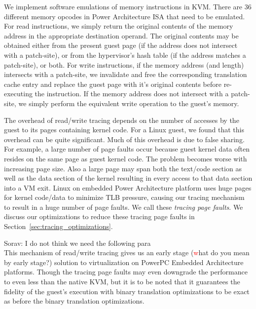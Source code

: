 We implement software emulations of memory instructions in KVM. There are 36 different memory opcodes in Power Architecture ISA that need to be emulated. For read instructions, we simply return the original contents of the memory address in the appropriate destination operand. The original contents may be obtained either from the present guest page (if the address does not intersect with a patch-site), or from the hypervisor's hash table (if the address matches a patch-site), or both. For write instructions, if the memory address (and length) intersects with a patch-site, we invalidate and free the corresponding translation cache entry and replace the guest page with it's original contents before re-executing the instruction. If the memory address does not intersect with a patch-site, we simply perform the equivalent write operation to the guest's memory. 

The overhead of read/write tracing depends on the number of accesses by the guest to its pages containing kernel code. For a Linux guest, we found that this overhead can be quite significant. Much of this overhead is due to false sharing. For example, a large number of page faults occur because guest kernel data often resides on the same page as guest kernel code. The problem becomes worse with increasing page size. Also a large page may span both the text/code section as well as the data section of the kernel resulting in every access to that data section into a VM exit. Linux on embedded Power Architecture platform uses huge pages for kernel code/data to minimize TLB pressure, causing our tracing mechanism to result in a huge number of page faults. We call these {\em tracing page faults}. We discuss our optimizations to reduce these tracing page faults in Section~\ref{sec:tracing_optimizations}.

Sorav: I do not think we need the following para\\
This mechanism of read/write tracing gives us an early stage ({\textcolor{red}what do you mean by early stage?}) solution to virtualization on PowerPC Embedded Architecture platforms. Though the tracing page faults may even downgrade the performance to even less than the native KVM, but it is to be noted that it guarantees the fidelity of the guest's execution with binary translation optimizations to be exact as before the binary translation optimizations.


